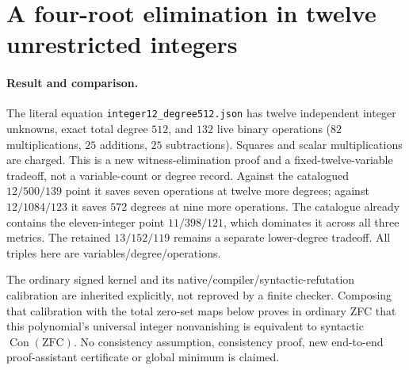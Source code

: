 \section{A four-root elimination in twelve unrestricted integers}
\label{sec:round21-four-roots}

\paragraph{Result and comparison.}
The literal equation \texttt{integer12\_degree512.json} has twelve independent
integer unknowns, exact total degree $512$, and $132$ live binary operations
($82$ multiplications, $25$ additions, $25$ subtractions). Squares and scalar
multiplications are charged. This is a new witness-elimination proof and a
fixed-twelve-variable tradeoff, not a variable-count or degree record. Against
the catalogued $12/500/139$ point it saves seven operations at twelve more
degrees; against $12/1084/123$ it saves $572$ degrees at nine more operations.
The catalogue already contains the eleven-integer point $11/398/121$,
which dominates it across all three metrics. The retained
$13/152/119$ remains a separate lower-degree tradeoff. All triples here are
variables/degree/operations.

The ordinary signed kernel and its native/compiler/syntactic-refutation
calibration are inherited explicitly, not reproved by a finite checker.
Composing that calibration with the total zero-set maps below proves in
ordinary ZFC that this polynomial's universal integer nonvanishing is
equivalent to syntactic $\operatorname{Con}(\mathrm{ZFC})$. No consistency
assumption, consistency proof, new end-to-end proof-assistant certificate or
global minimum is claimed.

